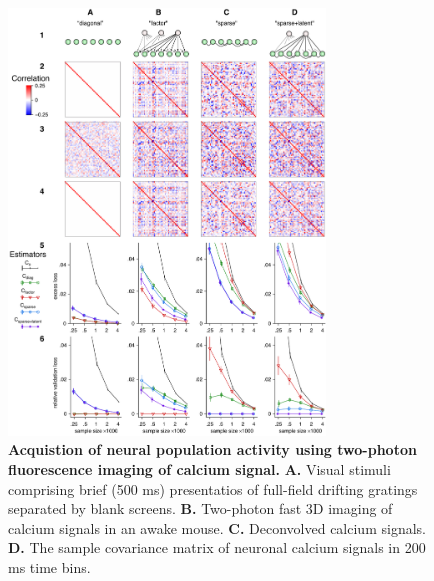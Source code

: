 \begin{figure}[htp]
\begin{center}
\includegraphics[width=0.75\textwidth]{figures/Figure1.pdf}
\end{center}
\caption{
{\bf Acquistion of neural population activity using two-photon fluorescence imaging of calcium signal.}  {\bf A.} Visual stimuli comprising brief (500 ms) presentatios of full-field drifting gratings separated by blank screens. {\bf B.} Two-photon fast 3D imaging of calcium signals in an awake mouse. {\bf C.} Deconvolved calcium signals. {\bf D.} The sample covariance matrix of neuronal calcium signals in 200 ms time bins. 
}
\label{fig:01}
\end{figure}
